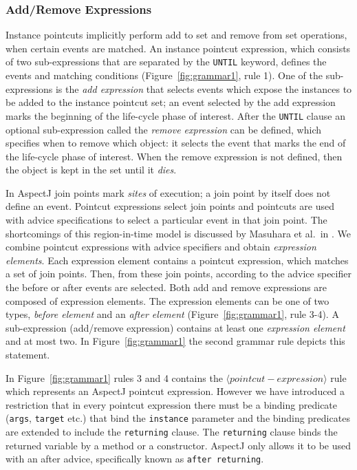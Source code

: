 \documentclass{acm_proc_article-sp}
\newcommand{\lstinln}[1]{\lstinline~#1~}
\begin{document}
\subsubsection{Add/Remove Expressions}
\label{sect:addrem}
Instance pointcuts implicitly perform add to set and remove from set operations, when certain events are matched. An instance pointcut expression, which consists of two sub-expressions that are separated by the \lstinln{UNTIL} keyword,  defines the events and matching conditions (Figure~\ref{fig:grammar1}, rule 1). One of the sub-expressions is the \emph{add expression} that selects events which expose the instances to be added to the instance pointcut set; an event selected by the add expression marks the beginning of the life-cycle phase of interest. After the \lstinln{UNTIL} clause an optional sub-expression called the \emph{remove expression} can be defined,  which specifies when to remove which object: it selects the event that marks the end of the life-cycle phase of interest. When the remove expression is not defined, then the object is kept in the set until it \emph{dies}.

 
In AspectJ join points mark \emph{sites} of execution; a join point by itself does not define an event. 
Pointcut expressions select join points and pointcuts are used with advice specifications to select a particular event in that join point. The shortcomings of this region-in-time model is discussed by Masuhara et al.\ in \cite{masuharafine}.
We combine pointcut expressions with advice specifiers and obtain \emph{expression elements}. Each expression element contains a pointcut expression, which matches a set of join points. Then, from these join points, according to the advice specifier the before or after events are selected.
Both add and remove expressions are composed of expression elements. The expression elements can be one of two types, \emph{before element} and an \emph{after element} (Figure~\ref{fig:grammar1}, rule 3-4). A sub-expression (add/remove expression) contains at least one \emph{expression element} and at most two. In Figure~\ref{fig:grammar1} the second grammar rule depicts this statement. 

In Figure~\ref{fig:grammar1} rules 3 and 4 contains the $\langle pointcut-expression\rangle$ rule which represents an AspectJ pointcut expression. However we have introduced a restriction that in every pointcut expression there must be a binding predicate (\lstinln{args}, \lstinln{target} etc.) that bind the \lstinln{instance} parameter and the binding predicates are extended to include the \lstinln{returning} clause. The \lstinln{returning} clause binds the returned variable by a method or a constructor. AspectJ only allows it to be used with an after advice, specifically known as \lstinln{after returning}. 
\end{document}
